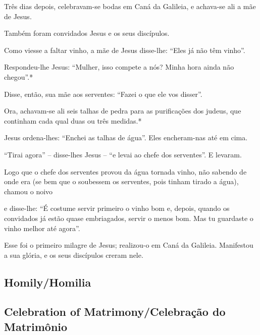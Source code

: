 \documentclass[10pt,a5]{article}
\begin{document}
\begin{paracol}{2}
Três dias depois, celebravam-se bodas em Caná da Galileia, e achava-se ali a mãe de Jesus.

Também foram convidados Jesus e os seus discípulos.

Como viesse a faltar vinho, a mãe de Jesus disse-lhe: “Eles já não têm vinho”.

Respondeu-lhe Jesus: “Mulher, isso compete a nós? Minha hora ainda não chegou”.*

Disse, então, sua mãe aos serventes: “Fazei o que ele vos disser”.

Ora, achavam-se ali seis talhas de pedra para as purificações dos judeus, que continham cada qual duas ou três medidas.*

Jesus ordena-lhes: “Enchei as talhas de água”. Eles encheram-nas até em cima.

“Tirai agora” – disse-lhes Jesus – “e levai ao chefe dos serventes”. E levaram.

Logo que o chefe dos serventes provou da água tornada vinho, não sabendo de onde era (se bem que o soubessem os serventes, pois tinham tirado a água), chamou o noivo

e disse-lhe: “É costume servir primeiro o vinho bom e, depois, quando os convidados já estão quase embriagados, servir o menos bom. Mas tu guardaste o vinho me­lhor até agora”.

Esse foi o primeiro milagre de Jesus; realizou-o em Caná da Galileia. Manifestou a sua glória, e os seus discípulos creram nele.



 \switchcolumn*

\end{paracol}

\begin{center}
	\subsection*{Homily/Homilia}
	\subsection*{Celebration of Matrimony/Celebra\c{c}\~ao do Matrim\^onio}
\end{center}
\vspace{1em}
\end{document}
